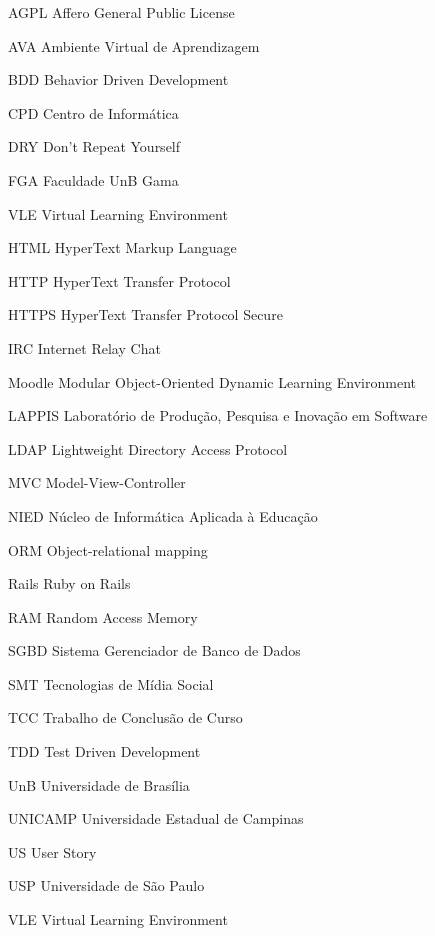\begin{siglas}
  \item[AGPL] Affero General Public License
  \item[AVA] Ambiente Virtual de Aprendizagem
  \item[BDD] Behavior Driven Development
  \item[CPD] Centro de Informática
  \item[DRY] Don’t Repeat Yourself
  \item[FGA] Faculdade UnB Gama
  \item[VLE] Virtual Learning Environment
  \item[HTML] HyperText Markup Language
  \item[HTTP] HyperText Transfer Protocol
  \item[HTTPS] HyperText Transfer Protocol Secure
  \item[IRC] Internet Relay Chat
  \item[Moodle] Modular Object-Oriented Dynamic Learning Environment
  \item[LAPPIS] Laboratório de Produção, Pesquisa e Inovação em Software
  \item[LDAP] Lightweight Directory Access Protocol
  \item[MVC] Model-View-Controller
  \item[NIED] Núcleo de Informática Aplicada à Educação
  \item[ORM] Object-relational mapping
  \item[Rails] Ruby on Rails
  \item[RAM] Random Access Memory
  \item[SGBD] Sistema Gerenciador de Banco de Dados
  \item[SMT] Tecnologias de Mídia Social
  \item[TCC] Trabalho de Conclusão de Curso
  \item[TDD] Test Driven Development
  \item[UnB] Universidade de Brasília
  \item[UNICAMP] Universidade Estadual de Campinas
  \item[US] User Story
  \item[USP] Universidade de São Paulo
  \item[VLE] Virtual Learning Environment
\end{siglas}
